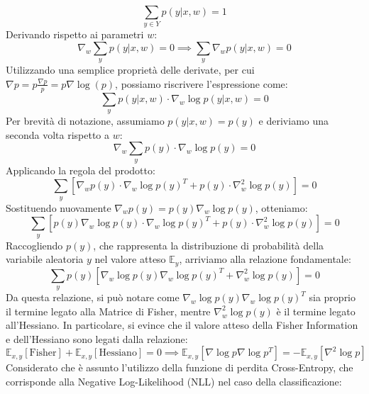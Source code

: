\begin{equation}
    \sum_{y \in Y} p(y|x,w) = 1
\end{equation}
Derivando rispetto ai parametri $w$:
\begin{equation}
    \nabla_w \sum_{y} p(y|x,w) = 0 \implies \sum_{y} \nabla_w p(y|x,w) = 0
\end{equation}
Utilizzando una semplice proprietà delle derivate, per cui $\nabla p = p \frac{\nabla p}{p} = p \nabla \log(p)$, possiamo riscrivere l'espressione come:
\begin{equation}
    \sum_{y} p(y|x,w) \cdot \nabla_w \log p(y|x,w) = 0
\end{equation}
Per brevità di notazione, assumiamo $p(y|x,w) = p(y)$ e deriviamo una seconda volta rispetto a $w$:
\begin{equation}
    \nabla_w \sum_{y} p(y) \cdot \nabla_w \log p(y) = 0
\end{equation}
Applicando la regola del prodotto:
\begin{equation}
    \sum_{y} \left[ \nabla_w p(y) \cdot \nabla_w \log p(y)^T + p(y) \cdot \nabla_w^2 \log p(y) \right] = 0
\end{equation}
Sostituendo nuovamente $\nabla_w p(y) = p(y) \nabla_w \log p(y)$, otteniamo:
\begin{equation}
    \sum_{y} \left[ p(y) \nabla_w \log p(y) \cdot \nabla_w \log p(y)^T + p(y) \cdot \nabla_w^2 \log p(y) \right] = 0
\end{equation}
Raccogliendo $p(y)$, che rappresenta la distribuzione di probabilità della variabile aleatoria $y$ nel valore atteso $\mathbb{E}_y$, arriviamo alla relazione fondamentale:
\begin{equation}
    \sum_{y} p(y) \left[ \nabla_w \log p(y) \nabla_w \log p(y)^T + \nabla_w^2 \log p(y) \right] = 0
\end{equation}
Da questa relazione, si può notare come $\nabla_w \log p(y) \nabla_w \log p(y)^T$ sia proprio il termine legato alla Matrice di Fisher, mentre $\nabla_w^2 \log p(y)$ è il termine legato all'Hessiano. In particolare, si evince che il valore atteso della Fisher Information e dell'Hessiano sono legati dalla relazione:
\begin{equation}
    \mathbb{E}_{x,y} [\text{Fisher}] + \mathbb{E}_{x,y} [\text{Hessiano}] = 0 \implies \mathbb{E}_{x,y} \left[ \nabla \log p \nabla \log p^T \right] = - \mathbb{E}_{x, y} \left[ \nabla^2 \log p \right]
\end{equation}
Considerato che è assunto l'utilizzo della funzione di perdita Cross-Entropy, che corrisponde alla Negative Log-Likelihood (NLL) nel caso della classificazione:
